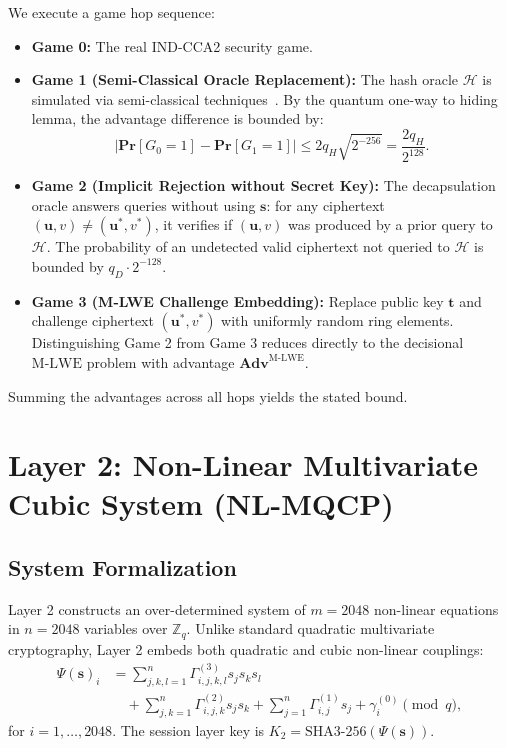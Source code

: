 \documentclass{ieeeaccess}
\renewcommand{\Pr}{\mathbf{Pr}}
\newcommand{\Adv}{\mathbf{Adv}}
\newcommand{\Z}{\mathbb{Z}}
\newcommand{\calH}{\mathcal{H}}
\newcommand{\bfs}{\mathbf{s}}
\newcommand{\bft}{\mathbf{t}}
\newcommand{\bfu}{\mathbf{u}}
\newenvironment{proof}{\begin{IEEEproof}\IEEEQEDoff}{\end{IEEEproof}}
\begin{document}
\begin{proof}
We execute a game hop sequence:
\begin{itemize}
  \item \textbf{Game 0:} The real IND-CCA2 security game.
  \item \textbf{Game 1 (Semi-Classical Oracle Replacement):} The hash oracle $\calH$ is simulated via semi-classical techniques~\cite{Zhandry2012}. By the quantum one-way to hiding lemma, the advantage difference is bounded by:
  \begin{equation}
    |\Pr[G_0=1] - \Pr[G_1=1]| \leq 2 q_H \sqrt{2^{-256}} = \frac{2 q_H}{2^{128}}.
  \end{equation}
  \item \textbf{Game 2 (Implicit Rejection without Secret Key):} The decapsulation oracle answers queries without using $\bfs$: for any ciphertext $(\bfu, v) \neq (\bfu^*, v^*)$, it verifies if $(\bfu, v)$ was produced by a prior query to $\calH$. The probability of an undetected valid ciphertext not queried to $\calH$ is bounded by $q_D \cdot 2^{-128}$.
  \item \textbf{Game 3 (M-LWE Challenge Embedding):} Replace public key $\bft$ and challenge ciphertext $(\bfu^*, v^*)$ with uniformly random ring elements. Distinguishing Game 2 from Game 3 reduces directly to the decisional $\mathrm{M\text{-}LWE}$ problem with advantage $\Adv^{\mathrm{M\text{-}LWE}}$.
\end{itemize}
Summing the advantages across all hops yields the stated bound.
\end{proof}

\section{Layer 2: Non-Linear Multivariate Cubic System (NL-MQCP)}
\label{sec:L2}

\subsection{System Formalization}
Layer 2 constructs an over-determined system of $m = 2048$ non-linear equations in $n = 2048$ variables over $\Z_q$. Unlike standard quadratic multivariate cryptography, Layer 2 embeds both quadratic and cubic non-linear couplings:
\begin{equation}
\begin{aligned}
  \Psi(\bfs)_i &= \sum_{j,k,l=1}^n \Gamma^{(3)}_{i,j,k,l} s_j s_k s_l \\
  &\quad + \sum_{j,k=1}^n \Gamma^{(2)}_{i,j,k} s_j s_k + \sum_{j=1}^n \Gamma^{(1)}_{i,j} s_j + \gamma_i^{(0)} \pmod q,
\end{aligned}
\label{eq:mqcp-cubic}
\end{equation}
for $i = 1, \dots, 2048$. The session layer key is $K_2 = \mathrm{SHA3\text{-}256}(\Psi(\bfs))$.
\end{document}
